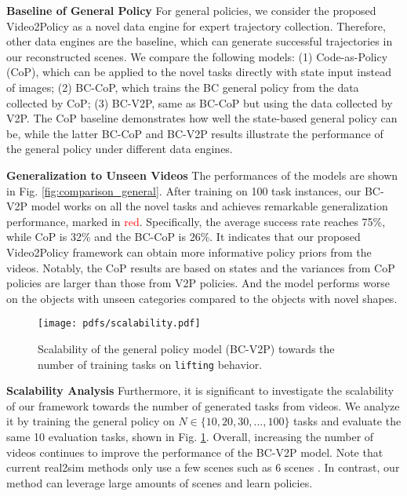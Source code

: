 \textbf{Baseline of General Policy} For general policies, we consider the proposed Video2Policy as a novel data engine for expert trajectory collection. Therefore, other data engines are the baseline, which can generate successful trajectories in our reconstructed scenes. We compare the following models: (1) Code-as-Policy (CoP), which can be applied to the novel tasks directly with state input instead of images; (2) BC-CoP, which trains the BC general policy from the data collected by CoP; (3) BC-V2P, same as BC-CoP but using the data collected by V2P. The CoP baseline demonstrates how well the state-based general policy can be, while the latter BC-CoP and BC-V2P results illustrate the performance of the general policy under different data engines.

\textbf{Generalization to Unseen Videos} The performances of the models are shown in Fig. \ref{fig:comparison_general}. After training on 100 task instances, our BC-V2P model works on all the novel tasks and achieves remarkable generalization performance, marked in \textcolor{red}{red}. Specifically, the average success rate reaches 75\%, while CoP is 32\% and the BC-CoP is 26\%. It indicates that our proposed Video2Policy framework can obtain more informative policy priors from the videos. Notably, the CoP results are based on states and the variances from CoP policies are larger than those from V2P policies. And the model performs worse on the objects with unseen categories compared to the objects with novel shapes. 

\begin{figure}
    \centering
    \vskip -0.1cm
    \texttt{[image: pdfs/scalability.pdf]}
    \vskip -0.3cm
    \caption{Scalability of the general policy model (BC-V2P) towards the number of training tasks on \texttt{lifting} behavior.}
    \label{fig:scalability}
    \vskip -0.3cm
\end{figure}

\textbf{Scalability Analysis} Furthermore, it is significant to investigate the scalability of our framework towards the number of generated tasks from videos. We analyze it by training the general policy on $N \in \{10, 20, 30, ..., 100\}$ tasks and evaluate the same 10 evaluation tasks, shown in Fig. \ref{fig:scalability}. Overall, increasing the number of videos continues to improve the performance of the BC-V2P model. Note that current real2sim methods only use a few scenes such as 6 scenes \citep{torne2024reconciling}. In contrast, our method can leverage large amounts of scenes and learn policies.

